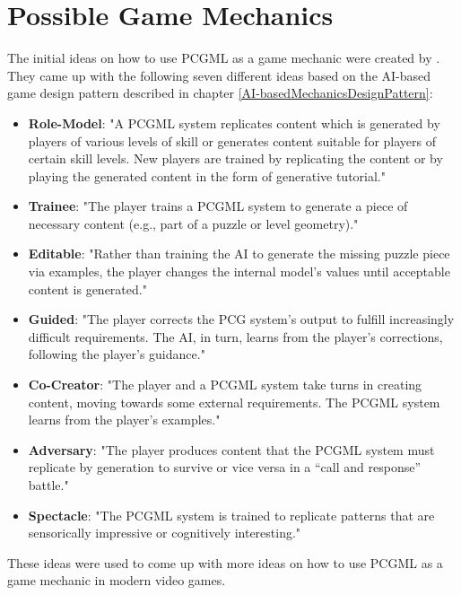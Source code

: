 \documentclass[MGS,Master,english]{twbook}%
\begin{document}
\chapter{Possible Game Mechanics}
The initial ideas on how to use PCGML as a game mechanic were created by \citep{pcgml::paper}. They came up with the following seven different ideas based on the AI-based game design pattern described in chapter \ref{AI-basedMechanicsDesignPattern}:
\begin{itemize}
	\item \textbf{Role-Model}: "A \ac{PCGML} system replicates content which is generated by players of various levels of skill or generates content suitable for players of certain skill levels. New players are trained by replicating the content or by playing the generated content in the form of generative tutorial." \cite{pcgml::paper}
	\item \textbf{Trainee}: "The player trains a \ac{PCGML} system to generate a piece of necessary content (e.g., part of a puzzle or level geometry)." \cite{pcgml::paper}
	\item \textbf{Editable}: "Rather than training the AI to generate the missing puzzle piece via examples, the player changes the internal model’s values until acceptable content is generated." \cite{pcgml::paper}
	\item \textbf{Guided}: "The player corrects the \ac{PCG} system’s output to fulfill increasingly difficult requirements. The \ac{AI}, in turn, learns from the player’s corrections, following the player’s guidance." \cite{pcgml::paper}
	\item \textbf{Co-Creator}: "The player and a \ac{PCGML} system take turns in creating content, moving towards some external requirements. The \ac{PCGML} system learns from the player’s examples." \cite{pcgml::paper} 
	\item \textbf{Adversary}: "The player produces content that the \ac{PCGML} system must replicate by generation to survive or vice versa in a “call and response” battle." \cite{pcgml::paper}
	\item \textbf{Spectacle}: "The \ac{PCGML} system is trained to replicate patterns that are sensorically impressive or cognitively interesting." \cite{pcgml::paper}
\end{itemize}
These ideas were used to come up with more ideas on how to use PCGML as a game mechanic in modern video games.
\end{document}
